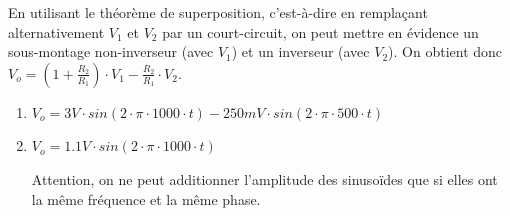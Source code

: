\documentclass{../template/tp}
\begin{document}
{
	En utilisant le théorème de superposition, c'est-à-dire en remplaçant alternativement $V_1$ et $V_2$ par un court-circuit, on peut mettre en évidence un sous-montage non-inverseur (avec $V_1$) et un inverseur (avec $V_2$).
	On obtient donc $V_o = (1+\frac{R_2}{R_1}) \cdot V_1 - \frac{R_2}{R_1} \cdot V_2$.

	\begin{enumerate}[label=\alph*)]
		\item $V_o = 3V \cdot sin(2 \cdot \pi \cdot 1000 \cdot t) - 250mV \cdot sin(2 \cdot \pi \cdot 500 \cdot t)$

		\item $V_o = 1.1 V \cdot sin(2 \cdot \pi \cdot 1000 \cdot t)$

		Attention, on ne peut additionner l'amplitude des sinusoïdes que si elles ont la même fréquence et la même phase.
	\end{enumerate}
}
\end{document}
